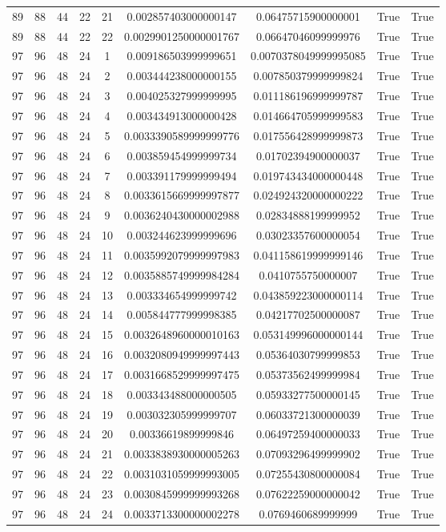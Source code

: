\documentclass[a4paper,11pt]{article}
\begin{document}
\begin{landscape}
\begin{longtable}{ccccccccc}
89 & 88 & 44 & 22 & 21 & 0.002857403000000147 & 0.06475715900000001 & True & True \\
89 & 88 & 44 & 22 & 22 & 0.0029901250000001767 & 0.06647046099999976 & True & True \\
97 & 96 & 48 & 24 & 1 & 0.009186503999999651 & 0.0070378049999995085 & True & True \\
97 & 96 & 48 & 24 & 2 & 0.003444238000000155 & 0.007850379999999824 & True & True \\
97 & 96 & 48 & 24 & 3 & 0.004025327999999995 & 0.011186196999999787 & True & True \\
97 & 96 & 48 & 24 & 4 & 0.003434913000000428 & 0.014664705999999583 & True & True \\
97 & 96 & 48 & 24 & 5 & 0.0033390589999999776 & 0.017556428999999873 & True & True \\
97 & 96 & 48 & 24 & 6 & 0.003859454999999734 & 0.01702394900000037 & True & True \\
97 & 96 & 48 & 24 & 7 & 0.003391179999999494 & 0.019743434000000448 & True & True \\
97 & 96 & 48 & 24 & 8 & 0.0033615669999997877 & 0.024924320000000222 & True & True \\
97 & 96 & 48 & 24 & 9 & 0.0036240430000002988 & 0.02834888199999952 & True & True \\
97 & 96 & 48 & 24 & 10 & 0.003244623999999696 & 0.03023357600000054 & True & True \\
97 & 96 & 48 & 24 & 11 & 0.0035992079999997983 & 0.041158619999999146 & True & True \\
97 & 96 & 48 & 24 & 12 & 0.0035885749999984284 & 0.0410755750000007 & True & True \\
97 & 96 & 48 & 24 & 13 & 0.003334654999999742 & 0.043859223000000114 & True & True \\
97 & 96 & 48 & 24 & 14 & 0.005844777999998385 & 0.04217702500000087 & True & True \\
97 & 96 & 48 & 24 & 15 & 0.0032648960000010163 & 0.053149996000000144 & True & True \\
97 & 96 & 48 & 24 & 16 & 0.0032080949999997443 & 0.05364030799999853 & True & True \\
97 & 96 & 48 & 24 & 17 & 0.0031668529999997475 & 0.05373562499999984 & True & True \\
97 & 96 & 48 & 24 & 18 & 0.003343488000000505 & 0.05933277500000145 & True & True \\
97 & 96 & 48 & 24 & 19 & 0.003032305999999707 & 0.06033721300000039 & True & True \\
97 & 96 & 48 & 24 & 20 & 0.00336619899999846 & 0.06497259400000033 & True & True \\
97 & 96 & 48 & 24 & 21 & 0.0033838930000005263 & 0.07093296499999902 & True & True \\
97 & 96 & 48 & 24 & 22 & 0.0031031059999993005 & 0.07255430800000084 & True & True \\
97 & 96 & 48 & 24 & 23 & 0.0030845999999993268 & 0.07622259000000042 & True & True \\
97 & 96 & 48 & 24 & 24 & 0.0033713300000002278 & 0.0769460689999999 & True & True \\


\end{longtable}
\end{landscape}
\end{document}
